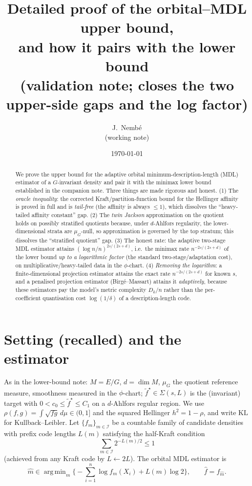 \documentclass[11pt]{article}
\title{\textbf{Detailed proof of the orbital--MDL upper bound,\\
and how it pairs with the lower bound}\\[0.3em]
\large (validation note; closes the two upper-side gaps and the log factor)}
\author{J.~Nemb\'e \\ \small (working note)}
\date{\today}
\theoremstyle{plain}
\theoremstyle{definition}
\theoremstyle{remark}
\newcommand{\KL}{\mathrm{KL}}
\DeclareMathOperator*{\argmin}{arg\,min}
\DeclareMathOperator{\dimm}{dim}
\begin{document}
\maketitle

\begin{abstract}
We prove the upper bound for the adaptive orbital minimum-description-length
(MDL) estimator of a $G$-invariant density and pair it with the minimax lower
bound established in the companion note. Three things are made rigorous and
honest. (1) The \emph{oracle inequality}: the corrected Kraft/partition-function
bound for the Hellinger affinity is proved in full and is \emph{tail-free}
(the affinity is always $\le1$), which dissolves the ``heavy-tailed affinity
constant'' gap. (2) The \emph{twin Jackson} approximation on the quotient holds on
possibly stratified quotients because, under $d$-Ahlfors regularity, the
lower-dimensional strata are $\mu_G$-null, so approximation is governed by the top
stratum; this dissolves the ``stratified quotient'' gap. (3) The honest rate:
the adaptive two-stage MDL estimator attains
$(\log n/n)^{2s/(2s+d)}$, i.e.\ the minimax rate $n^{-2s/(2s+d)}$ of the lower
bound \emph{up to a logarithmic factor} (the standard two-stage/adaptation cost),
on multiplicative/heavy-tailed data in the $\phi$-chart. (4) \emph{Removing the
logarithm}: a finite-dimensional projection estimator attains the exact rate
$n^{-2s/(2s+d)}$ for known $s$, and a penalised projection estimator
(Birg\'e--Massart) attains it \emph{adaptively}, because these estimators pay the
model's metric complexity $D_k/n$ rather than the per-coefficient quantisation
cost $\log(1/\delta)$ of a description-length code.
\end{abstract}

\section{Setting (recalled) and the estimator}

As in the lower-bound note: $M=E/G$, $d=\dimm M$, $\mu_G$ the quotient reference
measure, smoothness measured in the $\phi$-chart; $\tilde f^\star\in\Sigma(s,L)$ is
the (invariant) target with $0<c_0\le\tilde f^\star\le C_1$ on a $d$-Ahlfors
regular region. We use $\rho(f,g)=\int\sqrt{fg}\,d\mu\in(0,1]$ and the squared
Hellinger $h^2=1-\rho$, and write $\KL$ for Kullback--Leibler. Let
$\{f_m\}_{m\in\mathcal I}$ be a countable family of candidate densities with prefix
code lengths $L(m)$ satisfying the half-Kraft condition
\begin{equation}\label{eq:halfkraft}
\sum_{m\in\mathcal I}2^{-L(m)/2}\le1
\end{equation}
(achieved from any Kraft code by $L\leftarrow2L$). The orbital MDL estimator is
\begin{equation}\label{eq:mdl}
\widehat m\in\argmin_{m}\Big\{-\sum_{i=1}^n\log f_m(X_i)+L(m)\log2\Big\},
\qquad \widehat f=f_{\widehat m}.
\end{equation}
\end{document}
